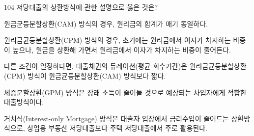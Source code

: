 \begin{question}{104}
저당대출의 상환방식에 관한 설명으로 옳은 것은?
\begin{choices}
  \item 원금균등분할상환(CAM) 방식의 경우, 원리금의 합계가 매기 동일하다.
  \item 원리금균등분할상환(CPM) 방식의 경우, 초기에는 원리금에서 이자가 차지하는 비중이 높으나, 원금을 상환해 가면서 원리금에서 이자가 차지하는 비중이 줄어든다.
  \item 다른 조건이 일정하다면, 대출채권의 듀레이션(평균 회수기간)은 원리금균등분할상환(CPM) 방식이 원금균등분할상환(CAM) 방식보다 짧다.
  \item 체증분할상환(GPM) 방식은 장래 소득이 줄어들 것으로 예상되는 차입자에게 적합한 대출방식이다.
  \item 거치식(Interest-only Mortgage) 방식은 대출자 입장에서 금리수입이 줄어드는 상환방식으로, 상업용 부동산 저당대출보다 주택 저당대출에서 주로 활용된다.
\end{choices}
\end{question}
